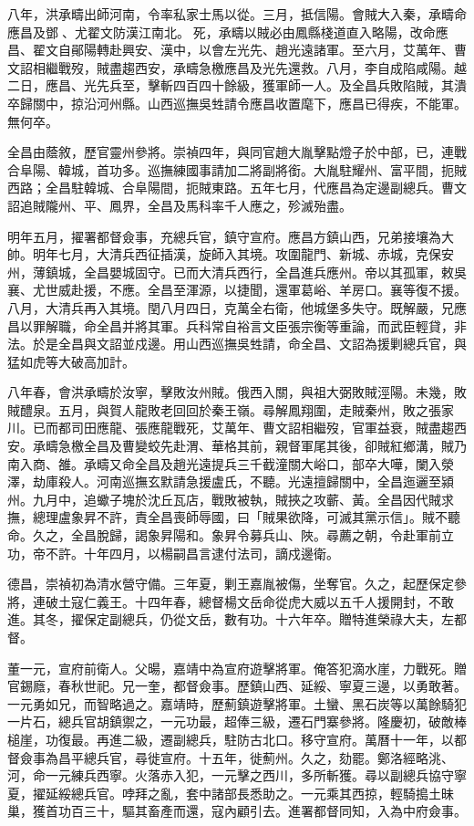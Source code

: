 \begin{pinyinscope}
八年，洪承疇出師河南，令率私家士馬以從。三月，抵信陽。會賊大入秦，承疇命應昌及鄧、尤翟文防漢江南北。死，承疇以賊必由鳳縣棧道直入略陽，改命應昌、翟文自鄖陽轉赴興安、漢中，以會左光先、趙光遠諸軍。至六月，艾萬年、曹文詔相繼戰歿，賊盡趨西安，承疇急檄應昌及光先還救。八月，李自成陷咸陽。越二日，應昌、光先兵至，擊斬四百四十餘級，獲軍師一人。及全昌兵敗陷賊，其潰卒歸關中，掠沿河州縣。山西巡撫吳甡請令應昌收置麾下，應昌已得疾，不能軍。無何卒。

全昌由蔭敘，歷官靈州參將。崇禎四年，與同官趙大胤擊點燈子於中部，已，連戰合阜陽、韓城，首功多。巡撫練國事請加二將副將銜。大胤駐耀州、富平間，扼賊西路；全昌駐韓城、合阜陽間，扼賊東路。五年七月，代應昌為定邊副總兵。曹文詔追賊隴州、平、鳳界，全昌及馬科率千人應之，殄滅殆盡。

明年五月，擢署都督僉事，充總兵官，鎮守宣府。應昌方鎮山西，兄弟接壤為大帥。明年七月，大清兵西征插漢，旋師入其境。攻圍龍門、新城、赤城，克保安州，薄鎮城，全昌嬰城固守。已而大清兵西行，全昌進兵應州。帝以其孤軍，敕吳襄、尤世威赴援，不應。全昌至渾源，以捷聞，還軍葛峪、羊房口。襄等復不援。八月，大清兵再入其境。閏八月四日，克萬全右衛，他城堡多失守。既解嚴，兄應昌以罪解職，命全昌并將其軍。兵科常自裕言文臣張宗衡等重論，而武臣輕貸，非法。於是全昌與文詔並戍邊。用山西巡撫吳甡請，命全昌、文詔為援剿總兵官，與猛如虎等大破高加計。

八年春，會洪承疇於汝寧，擊敗汝州賊。俄西入關，與祖大弼敗賊涇陽。未幾，敗賊醴泉。五月，與賀人龍敗老回回於秦王嶺。尋解鳳翔圍，走賊秦州，敗之張家川。已而都司田應龍、張應龍戰死，艾萬年、曹文詔相繼歿，官軍益衰，賊盡趨西安。承疇急檄全昌及曹變蛟先赴渭、華格其前，親督軍尾其後，卻賊紅鄉溝，賊乃南入商、雒。承疇又命全昌及趙光遠提兵三千截潼關大峪口，部卒大嘩，闌入滎澤，劫庫殺人。河南巡撫玄默請急援盧氏，不聽。光遠擅歸關中，全昌迤邐至潁州。九月中，追蠍子塊於沈丘瓦店，戰敗被執，賊挾之攻蘄、黃。全昌因代賊求撫，總理盧象昇不許，責全昌喪師辱國，曰「賊果欲降，可滅其黨示信」。賊不聽命。久之，全昌脫歸，謁象昇陽和。象昇令募兵山、陜。尋薦之朝，令赴軍前立功，帝不許。十年四月，以楊嗣昌言逮付法司，謫戍邊衛。

德昌，崇禎初為清水營守備。三年夏，剿王嘉胤被傷，坐奪官。久之，起歷保定參將，連破土寇仁義王。十四年春，總督楊文岳命從虎大威以五千人援開封，不敢進。其冬，擢保定副總兵，仍從文岳，數有功。十六年卒。贈特進榮祿大夫，左都督。

董一元，宣府前衛人。父暘，嘉靖中為宣府遊擊將軍。俺答犯滴水崖，力戰死。贈官錫廕，春秋世祀。兄一奎，都督僉事。歷鎮山西、延綏、寧夏三邊，以勇敢著。一元勇如兄，而智略過之。嘉靖時，歷薊鎮遊擊將軍。土蠻、黑石炭等以萬餘騎犯一片石，總兵官胡鎮禦之，一元功最，超俸三級，遷石門寨參將。隆慶初，破敵棒槌崖，功復最。再進二級，遷副總兵，駐防古北口。移守宣府。萬曆十一年，以都督僉事為昌平總兵官，尋徙宣府。十五年，徙薊州。久之，劾罷。鄭洛經略洮、河，命一元練兵西寧。火落赤入犯，一元擊之西川，多所斬獲。尋以副總兵協守寧夏，擢延綏總兵官。哱拜之亂，套中諸部長悉助之。一元乘其西掠，輕騎搗土昧巢，獲首功百三十，驅其畜產而還，寇內顧引去。進署都督同知，入為中府僉事。


\end{pinyinscope}
